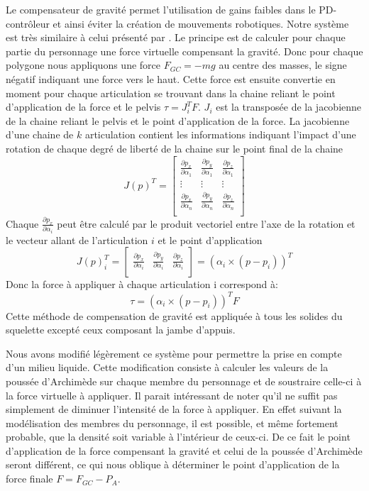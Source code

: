 \documentclass{llncs}
\begin{document}
Le compensateur de gravité permet l'utilisation de gains faibles dans le PD-contrôleur et ainsi éviter la création de mouvements robotiques. Notre système est très similaire à celui présenté par \cite{coros2010generalized}. Le principe est de calculer pour chaque partie du personnage une force virtuelle compensant la gravité. Donc pour chaque polygone nous appliquons une force \(F_{GC}=-mg\) au centre des masses, le signe négatif indiquant une force vers le haut. Cette force est ensuite convertie en moment pour chaque articulation se trouvant dans la chaine reliant le point d'application de la force et le pelvis \(\tau=J_i^T F\). \(J_i\) est la transposée de la jacobienne de la chaine reliant le pelvis et le point d'application de la force.
La jacobienne d'une chaine de \(k\) articulation contient les informations indiquant l'impact d'une rotation de chaque degré de liberté de la chaine sur le point final de la chaine
\[
J(p)^T =\begin{bmatrix}
\frac{\partial p_x}{\partial \alpha_1} & \frac{\partial p_y}{\partial \alpha_1} & \frac{\partial p_z}{\partial \alpha_1} \\
\vdots & \vdots & \vdots \\
\frac{\partial p_x}{\partial \alpha_n} & \frac{\partial p_y}{\partial \alpha_n} & \frac{\partial p_z}{\partial \alpha_n} \\
\end{bmatrix}
\]
Chaque \(\frac{\partial p_x}{\partial \alpha_i}\) peut être calculé par le produit vectoriel entre l'axe de la rotation et le vecteur allant de l'articulation \(i\) et le point d'application
\[
J(p)_i ^T =\begin{bmatrix}
\frac{\partial p_x}{\partial \alpha_i} & \frac{\partial p_y}{\partial \alpha_i} & \frac{\partial p_z}{\partial \alpha_i} \\
\end{bmatrix}
= (\alpha_i \times (p-p_i))^T
\]
Donc la force à appliquer à chaque articulation i correspond à:
\[
\tau = (\alpha_i \times (p-p_i))^T F
\]
Cette méthode de compensation de gravité est appliquée à tous les solides du squelette excepté ceux composant la jambe d'appuis.

Nous avons modifié légèrement ce système pour permettre la prise en compte d'un milieu liquide. Cette modification consiste à calculer les valeurs de la poussée d'Archimède sur chaque membre du personnage et de soustraire celle-ci à la force virtuelle à appliquer. Il parait intéressant de noter qu'il ne suffit pas simplement de diminuer l'intensité de la force à appliquer. En effet suivant la modélisation des membres du personnage, il est possible, et même fortement probable, que la densité soit variable à l'intérieur de ceux-ci. De ce fait le point d'application de la force compensant la gravité et celui de la poussée d'Archimède seront différent, ce qui nous oblique à déterminer le point d'application de la force finale \(F=F_{GC}- P_A\).
\end{document}
